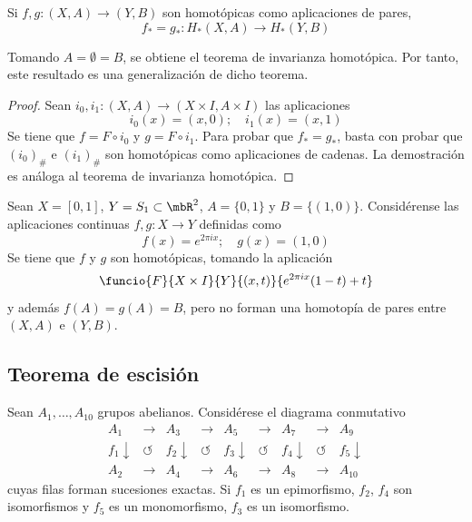 
\begin{teo}
Si $f,g: (X,A) \longrightarrow (Y,B)$ son homotópicas como aplicaciones de pares, $$f_*=g_*: H_*(X,A) \longrightarrow H_*(Y,B)$$
\end{teo}

Tomando $A=\emptyset=B$, se obtiene el teorema de invarianza homotópica. Por tanto, este resultado es una generalización de dicho teorema.

\begin{proof}
Sean $i_0,i_1: (X,A) \longrightarrow (X\times I,A\times I)$ las aplicaciones
$$i_0(x)=(x,0); \quad i_1(x)=(x,1)$$
Se tiene que $f=F\circ i_0$ y $g=F\circ i_1$. Para probar que $f_*=g_*$, basta con probar que $(i_0)_\#$ e $(i_1)_\#$ son homotópicas como aplicaciones de cadenas. La demostración es análoga al teorema de invarianza homotópica.
\end{proof}

\begin{ejem}
Sean $X=[0,1]$, $Y=S_1 \subset \mbR^2$, $A=\{0,1\}$ y $B=\{(1,0)\}$. Considérense las aplicaciones continuas $f,g: X \longrightarrow Y$ definidas como
$$f(x)=e^{2\pi i x}; \quad g(x)=(1,0)$$
Se tiene que $f$ y $g$ son homotópicas, tomando la aplicación $$\funcio{F}{X\times I}{Y}{(x,t)}{e^{2\pi i x}(1-t)+t}$$ y además $f(A)=g(A)=B$, pero no forman una homotopía de pares entre $(X,A)$ e $(Y,B)$.
\end{ejem}

\subsection{Teorema de escisión}
\begin{lema}
Sean $A_1,\dots, A_{10}$ grupos abelianos. Considérese el diagrama conmutativo
\[\begin{array}{ccccccccc}
A_1&\longrightarrow&A_3&\longrightarrow&A_5&\longrightarrow&A_7&\longrightarrow&A_9\\
f_1\downarrow&\circlearrowleft&f_2\downarrow&\circlearrowleft&f_3\downarrow&\circlearrowleft&f_4\downarrow&\circlearrowleft&f_5\downarrow\\
A_2&\longrightarrow&A_4&\longrightarrow&A_6&\longrightarrow&A_8&\longrightarrow&A_{10}
\end{array}\]
cuyas filas forman sucesiones exactas. Si $f_1$ es un epimorfismo, $f_2$, $f_4$ son isomorfismos y $f_5$ es un monomorfismo, $f_3$ es un isomorfismo.
\end{lema}

